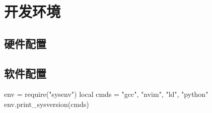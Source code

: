 \chapter{开发环境}
\section{硬件配置}


\section{软件配置}
\begin{luacode}
env = require("sysenv")
local cmds = {"gcc", "nvim", "ld", "python"}
env.print_sysversion(cmds)
\end{luacode}
